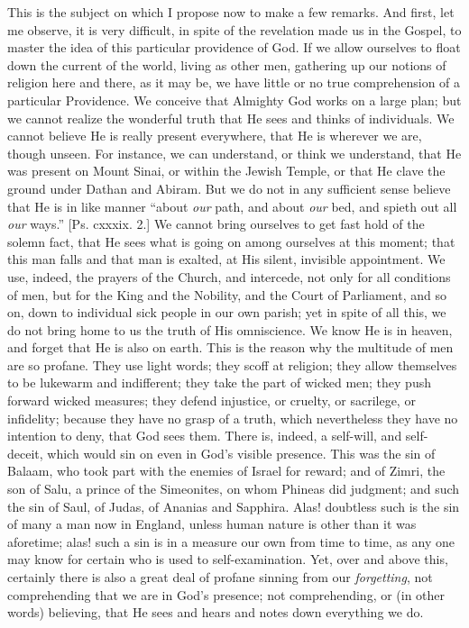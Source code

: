 This is the subject on which I propose now to make a few remarks.
And first, let me observe, it is very difficult, in spite of the
revelation made us in the Gospel, to master the idea of this
particular providence of God. If we allow ourselves to float down the
current of the world, living as other men, gathering up our notions of
religion here and there, as it may be, we have little or no true
comprehension of a particular Providence. We conceive that Almighty
God works on a large plan; but we cannot realize the wonderful truth
that He sees and thinks of individuals. We cannot believe He is really
present everywhere, that He is wherever we are, though unseen. For
instance, we can understand, or think we understand, that He was
present on Mount Sinai, or within the Jewish Temple, or that He clave
the ground under Dathan and Abiram. But we do not in any sufficient
sense believe that He is in like manner ``about \emph{our} path,
and about \emph{our} bed, and spieth out all \emph{our} ways.''
[Ps. cxxxix. 2.] We cannot bring ourselves to get fast hold of the
solemn fact, that He sees what is going on among ourselves at this
moment; that this man falls and that man is exalted, at His silent,
invisible appointment. We use, indeed, the prayers of the Church, and
intercede, not only for all conditions of men, but for the King and
the Nobility, and the Court of Parliament, and so on, down to
individual sick people in our own parish; yet in spite of all this, we
do not bring home to us the truth of His omniscience. We know He is in
heaven, and forget that He is also on earth. This is the reason why
the multitude of men are so profane. They use light words; they scoff
at religion; they allow themselves to be lukewarm and indifferent;
they take the part of wicked men; they push forward wicked measures;
they defend injustice, or cruelty, or sacrilege, or infidelity;
because they have no grasp of a truth, which nevertheless they have no
intention to deny, that God sees them. There is, indeed, a self-will,
and self-deceit, which would sin on even in God's visible presence.
This was the sin of Balaam, who took part with the enemies of Israel
for reward; and of Zimri, the son of Salu, a prince of the Simeonites,
on whom Phineas did judgment; and such the sin of Saul, of Judas, of
Ananias and Sapphira. Alas! doubtless such is the sin of many a man
now in England, unless human nature is other than it was aforetime;
alas! such a sin is in a measure our own from time to time, as any one
may know for certain who is used to self-examination. Yet, over and
above this, certainly there is also a great deal of profane sinning
from our \emph{forgetting}, not comprehending that we are in God's
presence; not comprehending, or (in other words) believing, that He
sees and hears and notes down everything we do.

